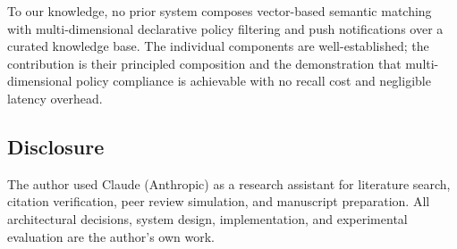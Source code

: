 \documentclass[11pt]{article}
\begin{document}
To our knowledge, no prior system composes vector-based semantic matching with multi-dimensional declarative policy filtering and push notifications over a curated knowledge base. The individual components are well-established; the contribution is their principled composition and the demonstration that multi-dimensional policy compliance is achievable with no recall cost and negligible latency overhead.

\subsection*{Disclosure}

The author used Claude (Anthropic) as a research assistant for literature search, citation verification, peer review simulation, and manuscript preparation. All architectural decisions, system design, implementation, and experimental evaluation are the author's own work.
\end{document}
